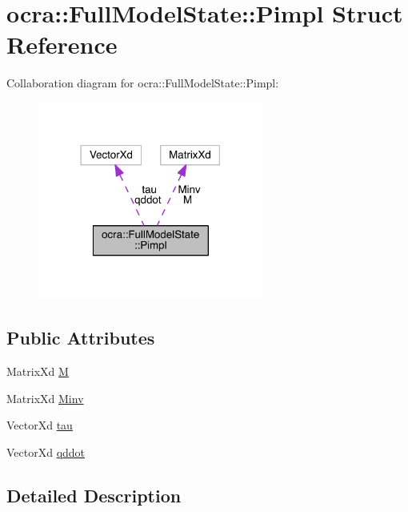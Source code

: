 \hypertarget{structocra_1_1FullModelState_1_1Pimpl}{}\section{ocra\+:\+:Full\+Model\+State\+:\+:Pimpl Struct Reference}
\label{structocra_1_1FullModelState_1_1Pimpl}


Collaboration diagram for ocra\+:\+:Full\+Model\+State\+:\+:Pimpl\+:\nopagebreak
\begin{figure}[H]
\begin{center}
\leavevmode
\includegraphics[width=210pt]{d9/d3a/structocra_1_1FullModelState_1_1Pimpl__coll__graph}
\end{center}
\end{figure}
\subsection*{Public Attributes}
\begin{DoxyCompactItemize}
\item 
Matrix\+Xd \hyperlink{structocra_1_1FullModelState_1_1Pimpl_a0482896483cb287cfc1066df1326f250}{M}
\item 
Matrix\+Xd \hyperlink{structocra_1_1FullModelState_1_1Pimpl_a66abf4494ddc5e7de0fbdeee4d6404d0}{Minv}
\item 
Vector\+Xd \hyperlink{structocra_1_1FullModelState_1_1Pimpl_a451de435a3d80fdc760ab0d37cbad664}{tau}
\item 
Vector\+Xd \hyperlink{structocra_1_1FullModelState_1_1Pimpl_a9575456409af57d39f990f2dda27c23f}{qddot}
\end{DoxyCompactItemize}


\subsection{Detailed Description}



